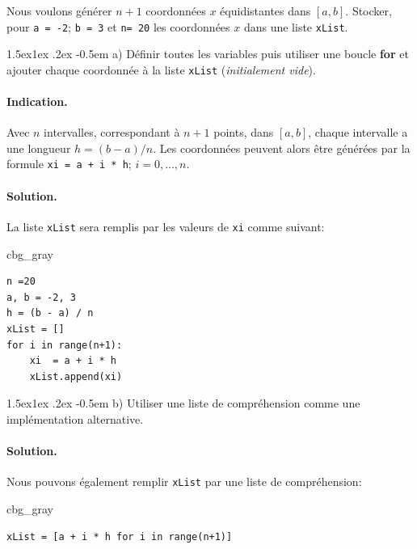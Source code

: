\documentclass[%
oneside,                 %
final,                   %
10pt,french]{article}
\makeatletter
\newenvironment{_cod_tight}[1]{
   \def\FrameCommand{\colorbox{#1}}
   \FrameRule0.6pt\MakeFramed {\FrameRestore}\vskip3mm}
   {\vskip0mm\endMakeFramed}
\newenvironment{cod}[1]{
\bgroup\rmfamily
\fboxsep=0mm\relax
\begin{_cod_tight}{#1}
\list{}{\parsep=-2mm\parskip=0mm\topsep=0pt\leftmargin=2mm
\rightmargin=2\leftmargin\leftmargin=4pt\relax}
\item\relax}
{\endlist\end{_cod_tight}\egroup}
\newenvironment{doconceexercise}{}{}
\newcounter{doconceexercisecounter}
\newcommand\subex{\@startsection{paragraph}{4}{\z@}%
                  {1.5ex\@plus1ex \@minus.2ex}%
                  {-0.5em}%
                  {\normalfont\normalsize\bfseries}}
\makeatother
\begin{document}
\begin{doconceexercise}


\label{ex:coordonnee}

Nous voulons générer $n + 1$ coordonnées $x$ équidistantes dans $[a, b]$. Stocker, pour \texttt{a = -2}; \texttt{b = 3} et \texttt{n= 20} les coordonnées $x$ dans une liste \texttt{xList}.


\subex{a)}
Définir toutes les variables puis utiliser une boucle \textbf{for} et ajouter chaque coordonnée à la liste \texttt{xList} (\emph{initialement vide}).


\paragraph{Indication.}
Avec $n$ intervalles, correspondant à $n + 1$ points, dans $[a, b]$, chaque intervalle a une longueur $h = (b-a) / n$. Les coordonnées peuvent alors être générées par la formule \texttt{xi = a + i * h}; $i = 0,…, n$.



\paragraph{Solution.}
La liste \texttt{xList} sera remplis par les valeurs de \texttt{xi} comme suivant:
\begin{cod}{cbg_gray}\begin{verbatim}
n =20
a, b = -2, 3
h = (b - a) / n
xList = []
for i in range(n+1):
    xi  = a + i * h
    xList.append(xi)
\end{verbatim}
\end{cod}
\noindent


\subex{b)}
Utiliser une liste de compréhension comme une implémentation alternative.


\paragraph{Solution.}
Nous pouvons également remplir \texttt{xList} par une liste de compréhension:
\begin{cod}{cbg_gray}\begin{verbatim}
xList = [a + i * h for i in range(n+1)]
\end{verbatim}
\end{cod}
\noindent


\end{doconceexercise}
\end{document}
